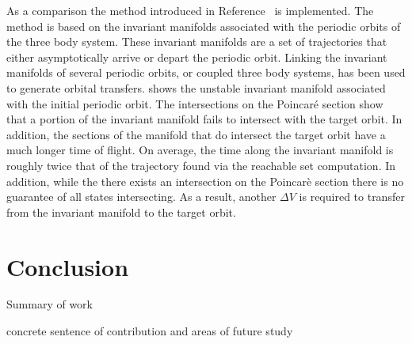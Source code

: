 \documentclass[letterpaper, preprint, paper,11pt]{AAS}	%
\begin{document}
As a comparison the method introduced in Reference~ is implemented.
The method is based on the invariant manifolds associated with the periodic orbits of the three body system.
These invariant manifolds are a set of trajectories that either asymptotically arrive or depart the periodic orbit. 
Linking the invariant manifolds of several periodic orbits, or coupled three body systems, has been used to generate orbital transfers.
 shows the unstable invariant manifold associated with the initial periodic orbit. 
The intersections on the Poincar\'e section show that a portion of the invariant manifold fails to intersect with the target orbit.
In addition, the sections of the manifold that do intersect the target orbit have a much longer time of flight. 
On average, the time along the invariant manifold is roughly twice that of the trajectory found via the reachable set computation.
In addition, while the there exists an intersection on the Poincar\`e section there is no guarantee of all states intersecting.
As a result, another \( \Delta V \) is required to transfer from the invariant manifold to the target orbit.



%
%
%
%
%
\section{Conclusion}\label{sec:conclusion}

Summary of work

concrete sentence of contribution and areas of future study



\appendix
\end{document}
